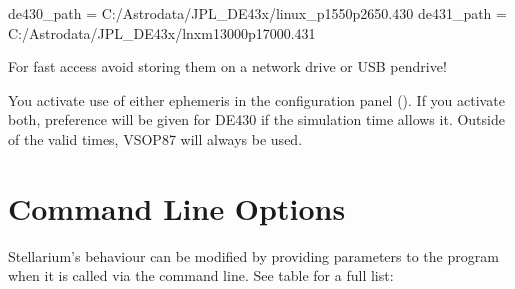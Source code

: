 \begin{configfile}
[astro]
de430_path = C:/Astrodata/JPL_DE43x/linux_p1550p2650.430
de431_path = C:/Astrodata/JPL_DE43x/lnxm13000p17000.431
\end{configfile}

For fast access avoid storing them on a network drive or USB pendrive!

You activate use of either ephemeris in the configuration panel
(). If you activate both, preference will be given for DE430
if the simulation time allows it. Outside of the valid times, VSOP87
will always be used.



\chapter{Command Line Options}
\label{sec:CommandLineOptions}

Stellarium's behaviour can be modified by providing parameters to the
program when it is called via the command line. See table for a full list:


